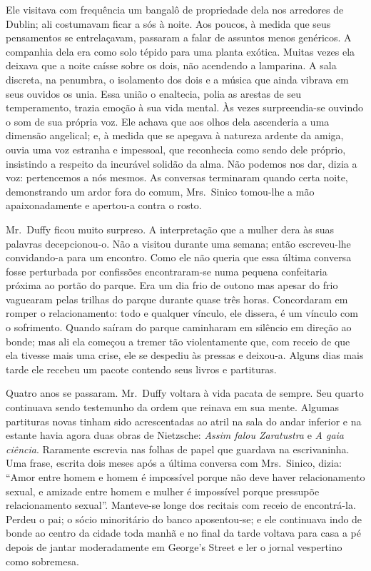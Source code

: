 Ele visitava com frequência um bangalô de propriedade dela nos arredores de
Dublin; ali costumavam ficar a sós à noite.  Aos poucos, à medida que seus
pensamentos se entrelaçavam, passaram a falar de assuntos menos genéricos.  A
companhia dela era como solo tépido para uma planta exótica.  Muitas vezes ela
deixava que a noite caísse sobre os dois, não acendendo a lamparina.  A sala
discreta, na penumbra, o isolamento dos dois e a música que ainda vibrava em
seus ouvidos os unia.  Essa união o enaltecia, polia as arestas de seu
temperamento, trazia emoção à sua vida mental.  Às vezes surpreendia-se ouvindo
o som de sua própria voz.  Ele achava que aos olhos dela ascenderia a uma
dimensão angelical; e, à medida que se apegava à natureza ardente da amiga,
ouvia uma voz estranha e impessoal, que reconhecia como sendo dele próprio,
insistindo a respeito da incurável solidão da alma.  Não podemos nos dar, dizia
a voz: pertencemos a nós mesmos.  As conversas terminaram quando certa noite,
demonstrando um ardor fora do comum, Mrs.~Sinico tomou-lhe a mão
apaixonadamente e apertou-a contra o rosto.

Mr.~Duffy ficou muito surpreso.  A interpretação que a mulher dera às suas
palavras decepcionou-o.  Não a visitou durante uma semana; então escreveu-lhe
convidando-a para um encontro.  Como ele não queria que essa última conversa
fosse perturbada por confissões encontraram-se numa pequena confeitaria próxima
ao portão do parque.  Era um dia frio de outono mas apesar do frio vaguearam
pelas trilhas do parque durante quase três horas.  Concordaram em romper o
relacionamento: todo e qualquer vínculo, ele dissera, é um vínculo com o
sofrimento.  Quando saíram do parque caminharam em silêncio em direção ao
bonde; mas ali ela começou a tremer tão violentamente que, com receio de que
ela tivesse mais uma crise, ele se despediu às pressas e deixou-a.  Alguns dias
mais tarde ele recebeu um pacote contendo seus livros e partituras.

Quatro anos se passaram.  Mr.~Duffy voltara à vida pacata de sempre.  Seu
quarto continuava sendo testemunho da ordem que reinava em sua mente.  Algumas
partituras novas tinham sido acrescentadas ao atril na sala do andar inferior e
na estante havia agora duas obras de Nietzsche: \textit{Assim falou
Zaratustra} e \textit{A gaia ciência}.  Raramente escrevia nas folhas
de papel que guardava na escrivaninha.  Uma frase, escrita dois meses após a
última conversa com Mrs.~Sinico, dizia: “Amor entre homem e homem é impossível
porque não deve haver relacionamento sexual, e amizade entre homem e mulher é
impossível porque pressupõe relacionamento sexual”.  Manteve-se longe dos
recitais com receio de encontrá-la.  Perdeu o pai; o sócio minoritário do banco
aposentou-se; e ele continuava indo de bonde ao centro da cidade toda manhã e
no final da tarde voltava para casa a pé depois de jantar moderadamente em
George’s Street e ler o jornal vespertino como sobremesa.

